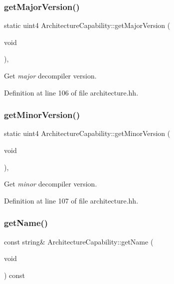 \subsubsection{\texorpdfstring{getMajorVersion()}{getMajorVersion()}}
{\footnotesize\ttfamily static uint4 Architecture\+Capability\+::get\+Major\+Version (\begin{DoxyParamCaption}\item[{void}]{ }\end{DoxyParamCaption})\hspace{0.3cm}{\ttfamily [inline]}, {\ttfamily [static]}}



Get {\itshape major} decompiler version. 



Definition at line 106 of file architecture.\+hh.

\mbox{\label{class_architecture_capability_a4faeb6f1d9405d04c76e5b70f76d0cb4}} 
\subsubsection{\texorpdfstring{getMinorVersion()}{getMinorVersion()}}
{\footnotesize\ttfamily static uint4 Architecture\+Capability\+::get\+Minor\+Version (\begin{DoxyParamCaption}\item[{void}]{ }\end{DoxyParamCaption})\hspace{0.3cm}{\ttfamily [inline]}, {\ttfamily [static]}}



Get {\itshape minor} decompiler version. 



Definition at line 107 of file architecture.\+hh.

\mbox{\label{class_architecture_capability_ad8a6f6079fde87a12582a68bfeab73af}} 
\subsubsection{\texorpdfstring{getName()}{getName()}}
{\footnotesize\ttfamily const string\& Architecture\+Capability\+::get\+Name (\begin{DoxyParamCaption}\item[{void}]{ }\end{DoxyParamCaption}) const\hspace{0.3cm}{\ttfamily [inline]}}



